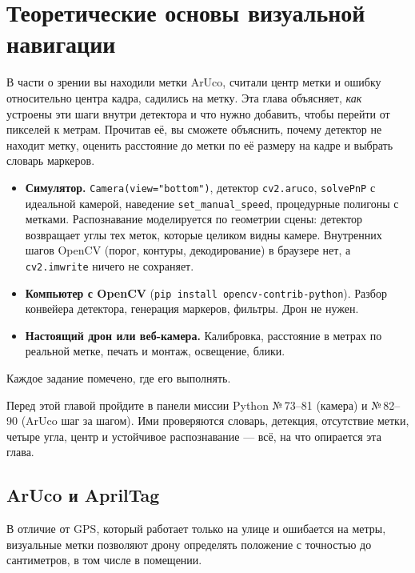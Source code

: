 \section{Теоретические основы визуальной навигации}
\label{sec:python-theory}

В части о зрении вы находили метки ArUco, считали центр метки и ошибку относительно центра кадра, садились на метку. Эта глава объясняет, \emph{как} устроены эти шаги внутри детектора и что нужно добавить, чтобы перейти от пикселей к метрам. Прочитав её, вы сможете объяснить, почему детектор не находит метку, оценить расстояние до метки по её размеру на кадре и выбрать словарь маркеров.

\begin{infobox}
\begin{itemize}
    \item \textbf{Симулятор.} \verb|Camera(view="bottom")|, детектор \verb|cv2.aruco|, \verb|solvePnP| с идеальной камерой, наведение \verb|set_manual_speed|, процедурные полигоны с метками. Распознавание моделируется по геометрии сцены: детектор возвращает углы тех меток, которые целиком видны камере. Внутренних шагов OpenCV (порог, контуры, декодирование) в браузере нет, а \verb|cv2.imwrite| ничего не сохраняет.
    \item \textbf{Компьютер с OpenCV} (\verb|pip install opencv-contrib-python|). Разбор конвейера детектора, генерация маркеров, фильтры. Дрон не нужен.
    \item \textbf{Настоящий дрон или веб-камера.} Калибровка, расстояние в метрах по реальной метке, печать и монтаж, освещение, блики.
\end{itemize}
Каждое задание помечено, где его выполнять.
\end{infobox}

\begin{missionbox}
Перед этой главой пройдите в панели  миссии Python №\,73--81 (камера) и №\,82--90 (ArUco шаг за шагом). Ими проверяются словарь, детекция, отсутствие метки, четыре угла, центр и устойчивое распознавание --- всё, на что опирается эта глава.
\end{missionbox}

\subsection{ArUco и AprilTag}
В отличие от GPS, который работает только на улице и ошибается на метры, визуальные метки позволяют дрону определять положение с точностью до сантиметров, в том числе в помещении.

